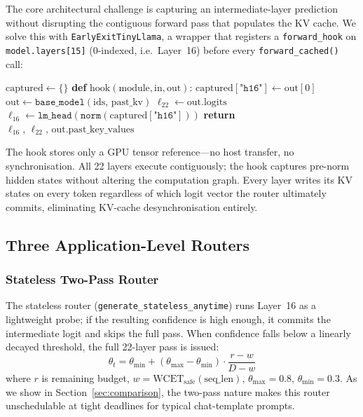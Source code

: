 \documentclass[conference]{IEEEtran}
\begin{document}
The core architectural challenge is capturing an intermediate-layer
prediction without disrupting the contiguous forward pass that populates
the KV cache.
We solve this with \texttt{EarlyExitTinyLlama}, a wrapper that registers a
\texttt{forward\_hook} on \texttt{model.layers[15]} (0-indexed, i.e.\
Layer~16) before every \texttt{forward\_cached()} call:

\begin{algorithmic}[1]
\STATE $\text{captured} \leftarrow \{\}$
\STATE \textbf{def} $\text{hook}(\text{module}, \text{in}, \text{out})$:
\STATE \quad $\text{captured}[\texttt{"h16"}] \leftarrow \text{out}[0]$
       \COMMENT{GPU ref, no host copy}
\STATE $\text{out} \leftarrow \texttt{base\_model}(\text{ids},\, \text{past\_kv})$
       \COMMENT{22 layers run}
\STATE $\ell_{22} \leftarrow \text{out.logits}$
\STATE $\ell_{16} \leftarrow \texttt{lm\_head}(\texttt{norm}(\text{captured}[\texttt{"h16"}]))$
\STATE \textbf{return} $\ell_{16},\, \ell_{22},\, \text{out.past\_key\_values}$
\end{algorithmic}

The hook stores only a GPU tensor reference---no host transfer, no
synchronisation.
All 22 layers execute contiguously; the hook captures
pre-norm hidden states without altering the computation graph.
Every layer writes its KV states on every token regardless of which logit
vector the router ultimately commits, eliminating KV-cache
desynchronisation entirely.

\subsection{Three Application-Level Routers}

\subsubsection{Stateless Two-Pass Router}

The stateless router (\texttt{generate\_stateless\_anytime}) runs
Layer~16 as a lightweight probe; if the resulting confidence is high
enough, it commits the intermediate logit and skips the full pass.
When confidence falls below a linearly decayed threshold, the full
22-layer pass is issued:
\begin{equation}
\theta_t = \theta_{\min} + (\theta_{\max} - \theta_{\min})
           \cdot \frac{r - w}{D - w}
\label{eq:decay}
\end{equation}
where $r$ is remaining budget, $w = \text{WCET}_{\text{safe}}(\text{seq\_len})$,
$\theta_{\max}=0.8$, $\theta_{\min}=0.3$.
As we show in Section~\ref{sec:comparison}, the two-pass nature makes
this router unschedulable at tight deadlines for typical chat-template
prompts.
\end{document}
